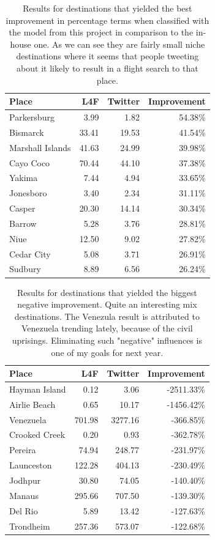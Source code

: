 \documentclass[minf,twoside,singlespacing,parskip,frontabs]{infthesis}
\begin{document}
\begin{table}[]
\begin{center}
\begin{tabular}{ l | r | r | r}
Place & L4F & Twitter & Improvement \\
\hline
Parkersburg & 3.99 & 1.82 & 54.38\% \\
Bismarck & 33.41 & 19.53 & 41.54\% \\
Marshall Islands & 41.63 & 24.99 & 39.98\% \\
Cayo Coco & 70.44 & 44.10 & 37.38\% \\
Yakima & 7.44 & 4.94 & 33.65\% \\
Jonesboro & 3.40 & 2.34 & 31.11\% \\
Casper & 20.30 & 14.14 & 30.34\% \\
Barrow & 5.28 & 3.76 & 28.81\% \\
Niue & 12.50 & 9.02 & 27.82\% \\
Cedar City & 5.08 & 3.71 & 26.91\% \\
Sudbury & 8.89 & 6.56 & 26.24\% \\
\end{tabular}
\end{center}
\caption{Results for destinations that yielded the best improvement in percentage terms when classified with the model from this project in comparison to the in-house one. As we can see they are fairly small niche destinations where it seems that people tweeting about it likely to result in a flight search to that place.}
\label{4-1}
\end{table}

\begin{table}[]
\begin{center}
\begin{tabular}{ l | r | r | r}
Place & L4F & Twitter & Improvement \\
\hline
Hayman Island & 0.12 & 3.06 & -2511.33\% \\
Airlie Beach & 0.65 & 10.17 & -1456.42\% \\
Venezuela & 701.98 & 3277.16 & -366.85\% \\
Crooked Creek & 0.20 & 0.93 & -362.78\% \\
Pereira & 74.94 & 248.77 & -231.97\% \\
Launceston & 122.28 & 404.13 & -230.49\% \\
Jodhpur & 30.80 & 74.05 & -140.40\% \\
Manaus & 295.66 & 707.50 & -139.30\% \\
Del Rio & 5.89 & 13.42 & -127.63\% \\
Trondheim & 257.36 & 573.07 & -122.68\%
\end{tabular}
\end{center}
\caption{Results for destinations that yielded the biggest negative improvement. Quite an interesting mix destinations. The Venezula result is attributed to Venezuela trending lately, because of the civil uprisings. Eliminating such "negative" influences is one of my goals for next year.}
\label{4-2}
\end{table}
\end{document}
